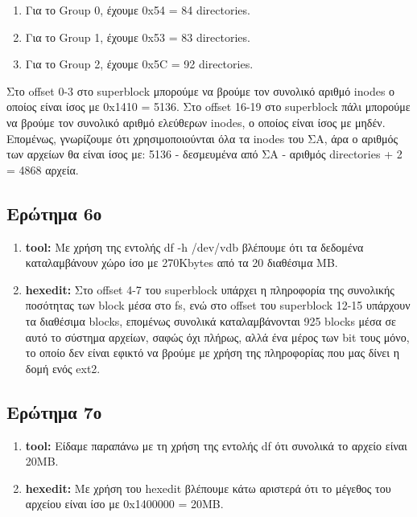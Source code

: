 \documentclass{article}
\begin{document}
\begin{enumerate}
\begin{enumerate}
{        \begin{enumerate}
            \item{Για το Group 0, έχουμε 0x54 = 84 directories.}
            \item{Για το Group 1, έχουμε 0x53 = 83 directories.}
            \item{Για το Group 2, έχουμε 0x5C = 92 directories.}
        \end{enumerate}

        Στο offset 0-3 στο superblock μπορούμε να βρούμε τον συνολικό αριθμό inodes ο οποίος είναι ίσος
        με 0x1410 = 5136. Στο offset 16-19 στο superblock πάλι μπορούμε να βρούμε τον συνολικό αριθμό
        ελεύθερων inodes, ο οποίος είναι ίσος με μηδέν. Επομένως, γνωρίζουμε ότι χρησιμοποιούνται όλα
        τα inodes του ΣΑ, άρα ο αριθμός των αρχείων θα είναι ίσος με: 
        5136 - δεσμευμένα από ΣΑ - αριθμός directories + 2 = 4868 αρχεία.\\
    }
\end{enumerate}

\subsection{Ερώτημα 6ο}
\begin{enumerate}
    \item{\textbf{tool: } Με χρήση της εντολής df -h /dev/vdb βλέπουμε ότι τα δεδομένα καταλαμβάνουν χώρο ίσο 
        με 270Kbytes από τα 20 διαθέσιμα MB.\\}
    \item{\textbf{hexedit: } Στο offset 4-7 του superblock υπάρχει η πληροφορία της συνολικής ποσότητας των block 
        μέσα στο fs, ενώ στο offset του superblock 12-15 υπάρχουν τα διαθέσιμα blocks, επομένως συνολικά καταλαμβάνονται
        925 blocks μέσα σε αυτό το σύστημα αρχείων, σαφώς όχι πλήρως, αλλά ένα μέρος των bit τους μόνο, το οποίο δεν
        είναι εφικτό να βρούμε με χρήση της πληροφορίας που μας δίνει η δομή ενός ext2.\\}
\end{enumerate}
\subsection{Ερώτημα 7ο}
\begin{enumerate}
    \item{\textbf{tool: }Είδαμε παραπάνω με τη χρήση της εντολής df ότι συνολικά το αρχείο είναι 20MB.\\}
    \item{\textbf{hexedit: }Με χρήση του hexedit βλέπουμε κάτω αριστερά ότι το μέγεθος του αρχείου είναι ίσο με
            0x1400000 = 20MB.\\}
\end{enumerate}


\end{enumerate}
\end{document}
